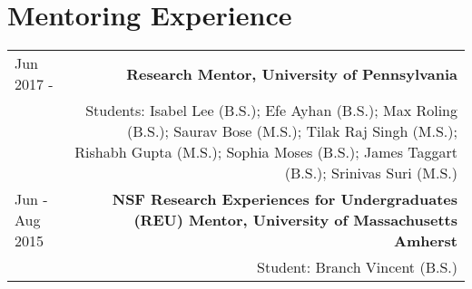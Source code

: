 \section*{Mentoring Experience}
\begin{tabular}{L!{\VRule}R}
Jun 2017 - & {\bf Research Mentor, University of Pennsylvania}\\
           & Students: 
                Isabel Lee (B.S.);
                Efe Ayhan (B.S.);
                Max Roling (B.S.); 
                Saurav Bose (M.S.);
                Tilak Raj Singh (M.S.);
                Rishabh Gupta (M.S.);
                Sophia Moses (B.S.);
                James Taggart (B.S.);
                Srinivas Suri (M.S.)
                \\
                Jun - Aug 2015& {\bf NSF Research Experiences for Undergraduates (REU) Mentor, University of Massachusetts Amherst} \\
& Student: Branch Vincent (B.S.) \\
\end{tabular}
